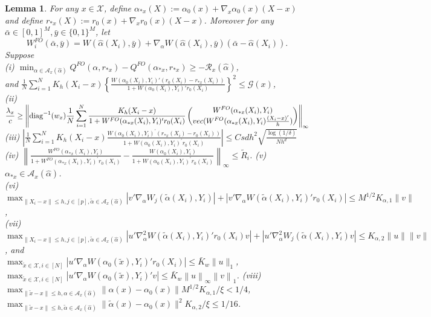 \documentclass[10pt,a4paper]{amsart}
\newtheorem{lemma}{Lemma}
\newcommand{\norm}[1]{\left\lVert #1 \right\rVert}
\begin{document}
\begin{lemma}\label{lemma:main:FO-covariate}
For any $x\in \mathcal{X}$, define $\alpha_{*x}(X):= \alpha_0(x)+\nabla_x\alpha_0(x)(X-x)$ and define $r_{*x}(X):= r_0(x)+\nabla_xr_0(x)(X-x)$. Moreover for any $\bar \alpha \in [0,1]^M, \bar y \in \{0,1\}^M$, let 
$$W^{FO}_i(\bar \alpha,\bar{y})=W(\hat \alpha(X_i),\bar y)+\nabla_\alpha W(\hat\alpha(X_i),\bar y)(\bar \alpha-\hat\alpha(X_i)).$$ 
Suppose\\
(i) $\min_{\alpha\in\mathcal{A}_x(\hat \alpha)}Q^{FO}(\alpha,r_{*x})-Q^{FO}(\alpha_{*x},r_{*x}) \geq -\mathcal{R}_x(\hat{\alpha})$, \\
and $\displaystyle\frac{1}{N}\sum_{i=1}^NK_h(X_i-x) \left\{\frac{W(\alpha_0(X_i),Y_i)'(r_0(X_i)-r_{*x}(X_i))}{1+ W(\alpha_0(X_i),Y_i)'r_0(X_i)}\right\}^2 \leq \mathcal{G}(x)$,\\
(ii)$\displaystyle\frac{\lambda_x}{c} \geq \left\|  \mathrm{diag}^{-1}(w_x)\frac{1}{N}\sum_{i=1}^N\frac{  K_h(X_i-x) }{1+W^{FO}(\alpha_{*x}(X_i),Y_i)^\prime r_0(X_i)} \begin{pmatrix} W^{FO}(\alpha_{*x}(X_i),Y_i)\\{\rm vec}( W^{FO}(\alpha_{*x}(X_i),Y_i)\frac{(X_i-x)'}{h} )
\end{pmatrix}\right\|_\infty $\\
(iii) $\displaystyle\left|\frac{1}{N}\sum_{i=1}^N K_h(X_i-x)\frac{ W(\alpha_0(X_i),Y_i)^\prime(r_{*x}(X_i)-r_0(X_i))}{1+W(\alpha_0(X_i),Y_i)^\prime r_0(X_i)}\right|\leq Csdh^2\sqrt{\frac{\log(1/\delta)}{Nh^d}}$\\ 
(iv) $\displaystyle\left\|\frac{ W^{FO}(\alpha_{*x}(X_i),Y_i)}{1+W^{FO}(\alpha_{*x}(X_i),Y_i)^\prime r_0(X_i)}-\frac{ W(\alpha_0(X_i),Y_i)}{1+W(\alpha_0(X_i),Y_i)^\prime r_0(X_i)}\right\|_\infty \leq \widetilde{R}_{i}$. (v) $\alpha_{*x} \in \mathcal{A}_x(\hat\alpha)$. \\
(vi) $\displaystyle \max_{\|X_i-x\|\leq h, j\in [p], \tilde \alpha \in \mathcal{A}_x(\hat\alpha)}|v'\nabla_\alpha W_j(\tilde \alpha(X_i),Y_i)|  +|v'\nabla_\alpha W(\tilde \alpha(X_i),Y_i)'r_0(X_i)| \leq M^{1/2}K_{\alpha,1}\|v\|$, \\
(vii) $\displaystyle\max_{\|X_i-x\|\leq h, j \in [p], \tilde \alpha \in \mathcal{A}_x(\hat\alpha)}|u'\nabla_\alpha^2 W(\tilde\alpha(X_i),Y_i)'r_0(X_i)v|+|u'\nabla_\alpha^2 W_j(\tilde\alpha(X_i),Y_i)v|\leq K_{\alpha,2}\|u\|\|v\|$, and\\
${\displaystyle\max_{\tilde{x}\in\mathcal{X},i\in[N]}}|u'\nabla_{\alpha}W(\alpha_0(\tilde{x}),Y_i)'r_0(X_i)|\leq\bar{K}_w\|u\|_1$, ${\displaystyle\max_{\tilde{x}\in\mathcal{X},i\in[N]}}|u'\nabla_{\alpha}W(\alpha_0(\tilde{x}),Y_i)'v|\leq \bar{K}_w\norm{u}_{\infty}\norm{v}_{1}$. (viii) ${\displaystyle\max_{\|\tilde{x}-x\|\leq h, \alpha \in \mathcal{A}_x(\hat\alpha)}}\|\alpha(x)-\alpha_0(x)\|M^{1/2}K_{\alpha,1}/\xi < 1/4$, ${\displaystyle\max_{\|\tilde{x}-x\|\leq h, \tilde\alpha \in \mathcal{A}_x(\hat\alpha)}}\|\tilde \alpha(x)-\alpha_0(x)\|^2 K_{\alpha,2}/\xi \leq 1/16$. 

\end{lemma}
\end{document}
